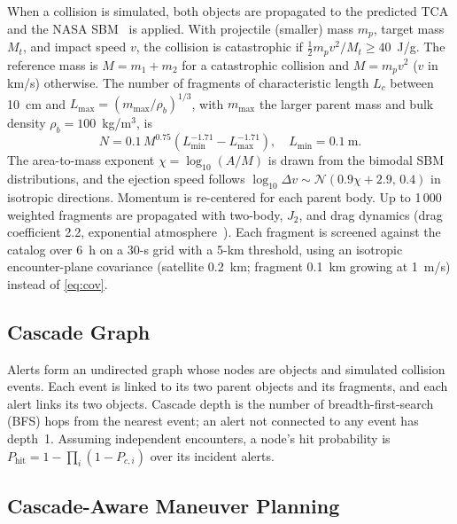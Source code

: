 \documentclass[conference]{IEEEtran}
\begin{document}
When a collision is simulated, both objects are propagated to the predicted
TCA and the NASA SBM~\cite{johnson2001} is applied. With projectile (smaller)
mass $m_p$, target mass $M_t$, and impact speed $v$, the collision is
catastrophic if $\tfrac{1}{2}m_p v^{2}/M_t\ge 40$~J/g. The reference mass is
$M=m_1+m_2$ for a catastrophic collision and $M=m_p v^{2}$ ($v$ in km/s)
otherwise. The number of fragments of characteristic length $L_c$ between
10~cm and $L_{\max}=(m_{\max}/\rho_b)^{1/3}$, with $m_{\max}$ the larger parent
mass and bulk density $\rho_b=100$~kg/m$^3$, is
\begin{equation}
  N=0.1\,M^{0.75}\left(L_{\min}^{-1.71}-L_{\max}^{-1.71}\right),\quad
  L_{\min}=0.1~\text{m}.
\label{eq:sbm}
\end{equation}
The area-to-mass exponent $\chi=\log_{10}(A/M)$ is drawn from the bimodal SBM
distributions, and the ejection speed follows
$\log_{10}\Delta v\sim\mathcal{N}(0.9\chi+2.9,\,0.4)$ in isotropic
directions. Momentum is re-centered for each parent body. Up to 1\,000 weighted
fragments are propagated with two-body, $J_2$, and drag dynamics (drag
coefficient 2.2, exponential atmosphere~\cite{vallado2006}). Each fragment is
screened against the catalog over 6~h on a 30-s grid with a 5-km threshold,
using an isotropic encounter-plane covariance (satellite 0.2~km; fragment
0.1~km growing at 1~m/s) instead of \eqref{eq:cov}.

\subsection{Cascade Graph}

Alerts form an undirected graph whose nodes are objects and simulated
collision events. Each event is linked to its two parent objects and its
fragments, and each alert links its two objects. Cascade depth is the number of
breadth-first-search (BFS) hops from the nearest event; an alert not connected
to any event has depth~1. Assuming independent encounters, a node's hit
probability is $P_{\mathrm{hit}}=1-\prod_i(1-P_{c,i})$ over its incident alerts.

\subsection{Cascade-Aware Maneuver Planning}
\end{document}
